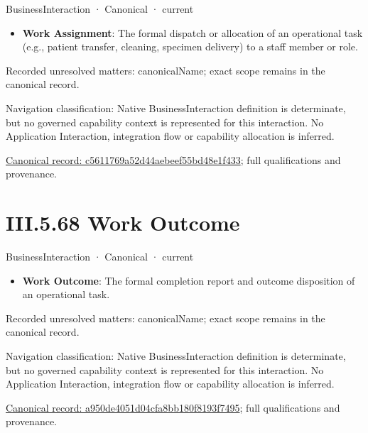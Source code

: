 \label{element:c5611769a52d44aebeef55bd48e1f433}
{\small BusinessInteraction · Canonical · current}\par

\begin{itemize}


\item \textbf{Work Assignment}: The formal dispatch or allocation of an operational task (e.g., patient transfer, cleaning, specimen delivery) to a staff member or role.

\end{itemize}

{\small Recorded unresolved matters: canonicalName; exact scope remains in the canonical record.}\par
{\small Navigation classification: Native BusinessInteraction definition is determinate, but no governed capability context is represented for this interaction. No Application Interaction, integration flow or capability allocation is inferred.}\par
{\footnotesize \href{../../../../../../../continuum/business/business-interaction/c5611769a52d44aebeef55bd48e1f433.md}{Canonical record: c5611769a52d44aebeef55bd48e1f433}; full qualifications and provenance.}\par
\section*{III.5.68 Work Outcome}
\label{navigation:III.5.68}

\label{element:a950de4051d04cfa8bb180f8193f7495}
{\small BusinessInteraction · Canonical · current}\par

\begin{itemize}


\item \textbf{Work Outcome}: The formal completion report and outcome disposition of an operational task.

\end{itemize}

{\small Recorded unresolved matters: canonicalName; exact scope remains in the canonical record.}\par
{\small Navigation classification: Native BusinessInteraction definition is determinate, but no governed capability context is represented for this interaction. No Application Interaction, integration flow or capability allocation is inferred.}\par
{\footnotesize \href{../../../../../../../continuum/business/business-interaction/a950de4051d04cfa8bb180f8193f7495.md}{Canonical record: a950de4051d04cfa8bb180f8193f7495}; full qualifications and provenance.}\par

